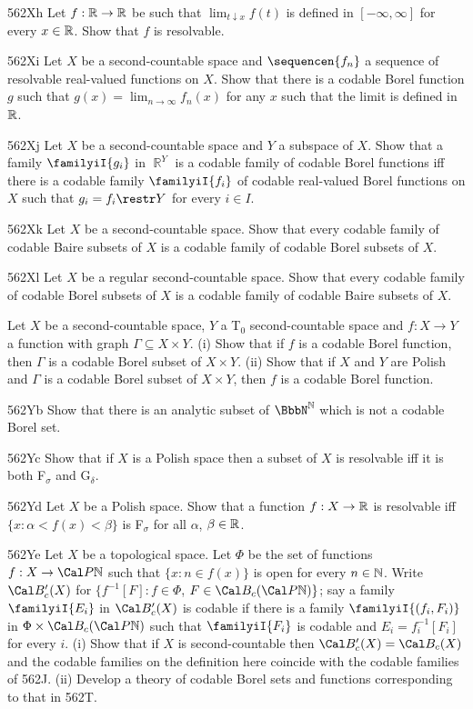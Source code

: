 {\spheader 562Xh Let $f:\Bbb R\to\Bbb R$ be such that
$\lim_{t\downarrow x}f(t)$ is defined in $[-\infty,\infty]$
for every $x\in\Bbb R$.   Show that $f$ is resolvable.

\spheader 562Xi Let $X$ be a second-countable space and
$\sequencen{f_n}$ a sequence of resolvable real-valued functions on $X$.
Show that there is a codable Borel function $g$ such that
$g(x)=\lim_{n\to\infty}f_n(x)$ for any $x$ such that the limit is defined
in $\Bbb R$.

\spheader 562Xj Let $X$ be a second-countable space and $Y$ a subspace of
$X$.   Show that a family $\familyiI{g_i}$ in $\BbbR^Y$ is a codable family
of codable Borel functions iff there is a codable family $\familyiI{f_i}$
of codable real-valued Borel functions on $X$ such that $g_i=f_i\restr Y$
for every $i\in I$.

\sqheader 562Xk Let $X$ be a second-countable space.   Show that every
codable family of codable Baire subsets of $X$ is a codable family of
codable Borel subsets of $X$.

\sqheader 562Xl Let $X$ be a regular second-countable space.
Show that every
codable family of codable Borel subsets of $X$ is a codable family of
codable Baire subsets of $X$.   

Let $X$ be a second-countable space, $Y$ a T$_0$
second-countable space and $f:X\to Y$ a function with graph
$\Gamma\subseteq X\times Y$.   (i) Show that if $f$ is a codable Borel
function, then $\Gamma$ is a codable Borel subset of $X\times Y$.
(ii) Show that if $X$ and $Y$ are Polish and $\Gamma$ is a codable Borel
subset of $X\times Y$, then $f$ is a codable Borel function.

\spheader 562Yb
Show that there is an analytic subset of $\NN$ which is not
a codable Borel set.   

\spheader 562Yc Show
that if $X$ is a Polish space then a subset of $X$ is resolvable iff it is
both F$_{\sigma}$ and G$_{\delta}$.

\spheader 562Yd Let $X$ be a Polish space.   Show that a function
$f:X\to\Bbb R$ is resolvable iff $\{x:\alpha<f(x)<\beta\}$ is
F$_{\sigma}$ for all $\alpha$, $\beta\in\Bbb R$.

\spheader 562Ye Let $X$ be a topological space.   Let $\Phi$ be the set of
functions $f:X\to\Cal P\Bbb N$ such that $\{x:n\in f(x)\}$ is open for
every $n\in\Bbb N$.   Write $\Cal B'_c(X)$ for
$\{f^{-1}[F]:f\in\Phi$,  $F\in\Cal B_c(\Cal P\Bbb N)\}$;  say a family
$\familyiI{E_i}$ in $\Cal B'_c(X)$ is codable if there is a family
$\familyiI{(f_i,F_i)}$ in $\Phi\times\Cal B_c(\Cal P\Bbb N)$ such that
$\familyiI{F_i}$ is codable and $E_i=f_i^{-1}[F_i]$ for every $i$.   (i)
Show that if $X$ is second-countable then $\Cal B'_c(X)=\Cal B_c(X)$ and
the codable families on the definition here coincide with the codable
families of 562J.   (ii) Develop a theory of codable Borel sets and
functions corresponding to that in 562T.
}%


